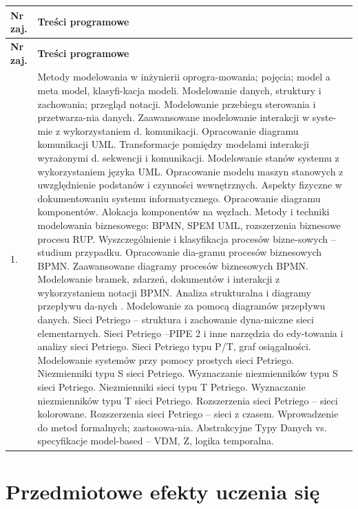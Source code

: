 \documentclass[12pt, a4paper]{article}
\newcommand{\thdrule}{\noalign{\global\setlength{\extrarowheight}{0pt}}}
\newcommand{\thdend}{\noalign{\global\setlength{\extrarowheight}{3pt}}}
\begin{document}
{\scriptsize
\begin{longtable}{m{1.5cm}m{14.5cm}}
\thdrule\toprule
\rowcolor{pjatkRed} {\color{white}\textbf{Nr zaj.}} & {\color{white}\textbf{Treści programowe}} \\
\midrule\thdend
\endfirsthead
\thdrule\toprule
\rowcolor{pjatkRed} {\color{white}\textbf{Nr zaj.}} & {\color{white}\textbf{Treści programowe}} \\
\midrule\thdend
\endhead
  \rowcolor{tableRowLight} 1. & Metody modelowania w inżynierii oprogra-mowania; pojęcia; model a meta model, klasyfi-kacja modeli. Modelowanie danych, struktury i zachowania; przegląd notacji. Modelowanie przebiegu sterowania i przetwarza-nia danych. Zaawansowane modelowanie interakcji w syste-mie z wykorzystaniem d. komunikacji. Opracowanie diagramu komunikacji UML. Transformacje pomiędzy modelami interakcji wyrażonymi d. sekwencji i komunikacji. Modelowanie stanów systemu z wykorzystaniem języka UML. Opracowanie modelu maszyn stanowych z uwzględnienie podstanów i czynności wewnętrznych. Aspekty fizyczne w dokumentowaniu systemu informatycznego. Opracowanie diagramu komponentów. Alokacja komponentów na węzłach. Metody i techniki modelowania biznesowego: BPMN, SPEM UML, rozszerzenia biznesowe procesu RUP. Wyszczególnienie i klasyfikacja procesów bizne-sowych – studium przypadku. Opracowanie dia-gramu procesów biznesowych BPMN. Zaawansowane diagramy procesów biznesowych BPMN. Modelowanie bramek, zdarzeń, dokumentów i interakcji z wykorzystaniem notacji BPMN. Analiza strukturalna i diagramy przepływu da-nych . Modelowanie za pomocą diagramów przepływu danych. Sieci Petriego – struktura i zachowanie dyna-miczne sieci elementarnych. Sieci Petriego –PIPE 2 i inne narzędzia do edy-towania i analizy sieci Petriego. Sieci Petriego typu P/T, graf osiągalności. Modelowanie systemów przy pomocy prostych sieci Petriego. Niezmienniki typu S sieci Petriego. Wyznaczanie niezmienników typu S sieci Petriego. Niezmienniki sieci typu T Petriego. Wyznaczanie niezmienników typu T sieci Petriego. Rozszerzenia sieci Petriego – sieci kolorowane. Rozszerzenia sieci Petriego – sieci z czasem. Wprowadzenie do metod formalnych; zastosowa-nia. Abstrakcyjne Typy Danych vs. specyfikacje model-based – VDM, Z, logika temporalna. \\
\bottomrule
\end{longtable}}

\section{Przedmiotowe efekty uczenia się}
\end{document}
